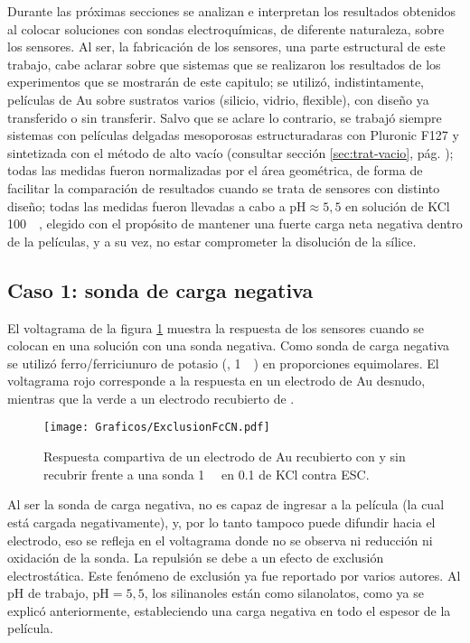 	Durante las próximas secciones se analizan e interpretan los resultados obtenidos al colocar soluciones con sondas electroquímicas, de diferente naturaleza, sobre los sensores. Al ser, la fabricación de los sensores, una parte estructural de este trabajo, cabe aclarar sobre que sistemas que se realizaron los resultados de los experimentos que se mostrarán de este capitulo; se utilizó, indistintamente, películas de Au sobre sustratos varios (silicio, vidrio, flexible), con diseño ya transferido o sin transferir. Salvo que se aclare lo contrario, se trabajó siempre sistemas con películas delgadas mesoporosas estructuradaras con Pluronic F127 y sintetizada con el método de alto vacío (consultar sección \ref{sec:trat-vacio}, pág. \pageref{sec:trat-vacio}); todas las medidas fueron normalizadas por el área geométrica, de forma de facilitar la comparación de resultados cuando se trata de sensores con distinto diseño; todas las medidas fueron llevadas a cabo a $\text{pH}\approx5,5$ en solución de KCl \SI{100}{\milli\Molar}, elegido con el propósito de mantener una fuerte carga neta negativa dentro de la películas, y a su vez, no estar comprometer la disolución de la sílice.

	\subsection{Caso 1: sonda de carga negativa}

	 El voltagrama de la figura \ref{fig:exclusion_vs_Au} muestra la respuesta de los sensores cuando se colocan en una solución con una sonda negativa. Como sonda de carga negativa se utilizó ferro/ferriciunuro de potasio (\ferroferri, \SI{1}{\milli\Molar}) en proporciones equimolares. El voltagrama rojo corresponde a la respuesta en un electrodo de Au desnudo, mientras que la verde a un electrodo recubierto de \pdm.
	
			\begin{figure}[ht]
				\centering
		 	    \texttt{[image: Graficos/ExclusionFcCN.pdf]}
		        \caption[Exclusión electrostática]{Respuesta compartiva de un electrodo de Au recubierto con \pdmF\space y sin recubrir frente a una sonda \ferroferri \SI{1}{\milli\Molar} en \SI{0.1}{\Molar} de KCl contra ESC.}
		        \label{fig:exclusion_vs_Au}
		      	\end{figure}
	
	 Al ser la sonda de carga negativa, no es capaz de ingresar a la película (la cual está cargada negativamente), y, por lo tanto tampoco puede difundir hacia el electrodo, eso se refleja en el voltagrama donde no se observa ni reducción ni oxidación de la sonda. La repulsión se debe a un efecto de exclusión electrostática. Este fenómeno de exclusión ya fue reportado por varios autores\cite{alberti2015,schmuhl2005,Andrieu-Brunsen2015,brunsen2011}. Al pH de trabajo, $\text{pH}=5,5$, los silinanoles están como silanolatos, como ya se explicó anteriormente, estableciendo una carga negativa en todo el espesor de la película.

